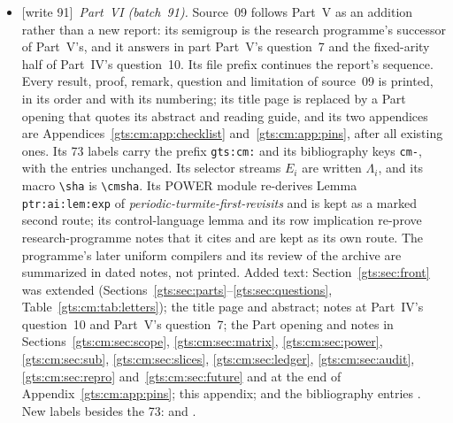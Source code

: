 \documentclass[11pt,letterpaper]{article}
\theoremstyle{definition}
\theoremstyle{remark}
\newcommand{\sha}{\texttt{c58206ca101d4744a015a0f0104646109357d943}}
\newcommand{\cmsha}[1]{\par\noindent{\footnotesize\ttfamily\seqsplit{#1}}\par}
\newcommand{\wtagd}{\textup{[write 91]}}
\begin{document}
\begin{itemize}
\item \wtagd\ \emph{Part~VI (batch~91).} Source~09 follows Part~V as an addition rather than a new report: its semigroup is the research programme's successor of Part~V's, and it answers in part Part~V's question~7 and the fixed-arity half of Part~IV's question~10. Its file prefix  continues the report's sequence. Every result, proof, remark, question and limitation of source~09 is printed, in its order and with its numbering; its title page is replaced by a Part opening that quotes its abstract and reading guide, and its two appendices are Appendices~\ref{gts:cm:app:checklist} and~\ref{gts:cm:app:pins}, after all existing ones. Its 73 labels carry the prefix \texttt{gts:cm:} and its bibliography keys \texttt{cm-}, with the entries unchanged. Its selector streams $E_i$ are written $\Lambda_i$, and its macro \verb|\sha| is \verb|\cmsha|. Its POWER module re-derives Lemma \texttt{ptr:ai:lem:exp} of \emph{periodic-turmite-first-revisits} and is kept as a marked second route; its control-language lemma and its row implication re-prove research-programme notes that it cites and are kept as its own route. The programme's later uniform compilers and its review of the archive are summarized in dated notes, not printed. Added text: Section~\ref{gts:sec:front} was extended (Sections~\ref{gts:sec:parts}--\ref{gts:sec:questions}, Table~\ref{gts:cm:tab:letters}); the title page and abstract; notes at Part~IV's question~10 and Part~V's question~7; the Part opening and notes in Sections~\ref{gts:cm:sec:scope}, \ref{gts:cm:sec:matrix}, \ref{gts:cm:sec:power}, \ref{gts:cm:sec:sub}, \ref{gts:cm:sec:slices}, \ref{gts:cm:sec:ledger}, \ref{gts:cm:sec:audit}, \ref{gts:cm:sec:repro} and~\ref{gts:cm:sec:future} and at the end of Appendix~\ref{gts:cm:app:pins}; this appendix; and the bibliography entries \cite{repo-revcm,repo-fusion,ptr,smc}. New labels besides the 73:  and .
\end{itemize}
\end{document}
